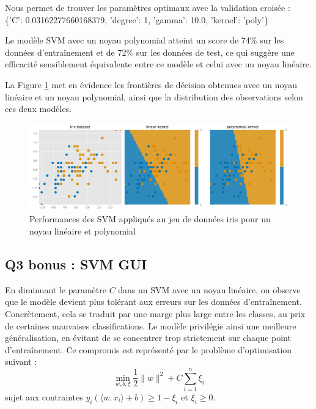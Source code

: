 \documentclass{scrartcl}
\begin{document}
Nous permet de trouver les paramètres optimaux avec la validation croisée :\\
\{'C': 0.03162277660168379, 'degree': 1, 'gamma': 10.0, 'kernel': 'poly'\}\newline

Le modèle SVM avec un noyau polynomial atteint un score de 74\% sur les données d'entraînement et de 72\% sur les données de test, ce qui suggère une efficacité sensiblement équivalente entre ce modèle et celui avec un noyau linéaire.\newline

La Figure \ref{fig:noyaux} met en évidence les frontières de décision obtenues avec un noyau linéaire et un noyau polynomial, ainsi que la distribution des observations selon ces deux modèles.\newline

\begin{figure}[H]
    \centering
    \includegraphics[width=1\textwidth]{../images/iris.png}
    \caption{\centering Performances des SVM appliqués au jeu de données iris pour un noyau linéaire et polynomial} 
    \label{fig:noyaux}
\end{figure}


\subsection{Q3 bonus : SVM GUI}

\hspace{7pt} En diminuant le paramètre $C$ dans un SVM avec un noyau linéaire, on observe que le modèle devient plus tolérant aux erreurs sur les données d'entraînement. Concrètement, cela se traduit par une marge plus large entre les classes, au prix de certaines mauvaises classifications. Le modèle privilégie ainsi une meilleure généralisation, en évitant de se concentrer trop strictement sur chaque point d'entraînement.  Ce compromis est représenté par le problème d'optimisation suivant :
\[
\min_{w, b, \xi} \frac{1}{2} \|w\|^2 + C \sum_{i=1}^{n} \xi_i
\]
sujet aux contraintes \(y_i (\langle w, x_i \rangle + b) \geq 1 - \xi_i\) et \(\xi_i \geq 0\).
\newline
\end{document}
